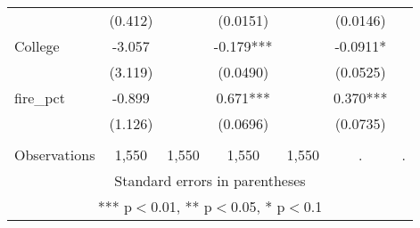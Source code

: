 \begin{tabular}{lcccccc}
 & (0.412) &  & (0.0151) &  & (0.0146) &  \\
College & -3.057 &  & -0.179*** &  & -0.0911* &  \\
 & (3.119) &  & (0.0490) &  & (0.0525) &  \\
fire\_pct & -0.899 &  & 0.671*** &  & 0.370*** &  \\
 & (1.126) &  & (0.0696) &  & (0.0735) &  \\
 &  &  &  &  &  &  \\
 Observations & 1,550 & 1,550 & 1,550 & 1,550 & . & . \\ \hline
\multicolumn{7}{c}{ Standard errors in parentheses} \\
\multicolumn{7}{c}{ *** p$<$0.01, ** p$<$0.05, * p$<$0.1} \\
\end{tabular}
